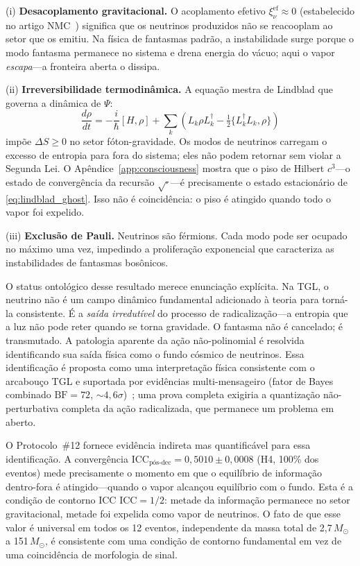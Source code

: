 \documentclass[12pt,a4paper,twocolumn]{article}
\newcommand{\CCI}{\text{ICC}}
\begin{document}
(i) \textbf{Desacoplamento gravitacional.} O acoplamento efetivo
$\xi_\nu^{\text{ef}} \approx 0$ (estabelecido no artigo NMC~\cite{Miguel2025NMC})
significa que os neutrinos produzidos não se reacooplam ao setor que os emitiu.
Na física de fantasmas padrão, a instabilidade surge porque o modo fantasma
permanece no sistema e drena energia do vácuo; aqui o vapor \emph{escapa}---a
fronteira aberta o dissipa.

(ii) \textbf{Irreversibilidade termodinâmica.} A equação mestra de Lindblad
que governa a dinâmica de $\Psi$:
\begin{equation}
\frac{d\rho}{dt} = -\frac{i}{\hbar}[H,\rho] +
\sum_k\!\left(L_k\rho L_k^\dagger - \tfrac{1}{2}\{L_k^\dagger L_k,\rho\}\right)
\label{eq:lindblad_ghost}
\end{equation}
impõe $\Delta S \geq 0$ no setor fóton-gravidade. Os modos de neutrinos
carregam o excesso de entropia para fora do sistema; eles não podem retornar
sem violar a Segunda Lei. O Apêndice~\ref{app:consciousness} mostra que
o piso de Hilbert $c^3$---o estado de convergência da recursão $\sqrt{\cdot}$---é
precisamente o estado estacionário de \eqref{eq:lindblad_ghost}.
Isso não é coincidência: o piso é atingido quando todo o vapor foi expelido.

(iii) \textbf{Exclusão de Pauli.} Neutrinos são férmions. Cada modo pode ser
ocupado no máximo uma vez, impedindo a proliferação exponencial que
caracteriza as instabilidades de fantasmas bosônicos.

O status ontológico desse resultado merece enunciação explícita. Na TGL,
o neutrino não é um campo dinâmico fundamental adicionado à teoria para
torná-la consistente. É a \emph{saída irredutível} do processo de
radicalização---a entropia que a luz não pode reter quando se torna gravidade.
O fantasma não é cancelado; é transmutado. A patologia aparente da ação
não-polinomial é resolvida identificando sua saída física como o fundo
cósmico de neutrinos. Essa identificação é proposta como uma interpretação
física consistente com o arcabouço TGL e suportada por evidências
multi-mensageiro (fator de Bayes combinado $\text{BF} = 72$,
$\sim 4{,}6\sigma$)~\cite{Miguel2025NMC}; uma prova completa exigiria a
quantização não-perturbativa completa da ação radicalizada, que permanece
um problema em aberto.

O Protocolo~\#12 fornece evidência indireta mas quantificável para essa
identificação. A convergência $\CCI_{\text{pós-dec}} = 0{,}5010 \pm 0{,}0008$
(H4, 100\% dos eventos) mede precisamente o momento em que o equilíbrio de
informação dentro-fora é atingido---quando o vapor alcançou equilíbrio com
o fundo. Esta é a condição de contorno ICC $\CCI = 1/2$: metade da
informação permanece no setor gravitacional, metade foi expelida como vapor
de neutrinos. O fato de que esse valor é universal em todos os 12 eventos,
independente da massa total de 2{,}7\,$M_\odot$ a 151\,$M_\odot$, é
consistente com uma condição de contorno fundamental em vez de uma
coincidência de morfologia de sinal.
\end{document}
